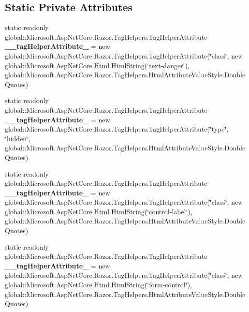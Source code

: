 \subsection*{Static Private Attributes}
\begin{DoxyCompactItemize}
\item 
\mbox{\label{class_asp_net_core_1_1_views___items___edit_af756f4b58e1f7cecb049c515534765eb}} 
static readonly global\+::\+Microsoft.\+Asp\+Net\+Core.\+Razor.\+Tag\+Helpers.\+Tag\+Helper\+Attribute {\bfseries \+\_\+\+\_\+tag\+Helper\+Attribute\+\_} = new global\+::\+Microsoft.\+Asp\+Net\+Core.\+Razor.\+Tag\+Helpers.\+Tag\+Helper\+Attribute(\char`\"{}class\char`\"{}, new global\+::\+Microsoft.\+Asp\+Net\+Core.\+Html.\+Html\+String(\char`\"{}text-\/danger\char`\"{}), global\+::\+Microsoft.\+Asp\+Net\+Core.\+Razor.\+Tag\+Helpers.\+Html\+Attribute\+Value\+Style.\+Double\+Quotes)
\item 
\mbox{\label{class_asp_net_core_1_1_views___items___edit_aecf638c71b63d1ba17280a10a91d20f5}} 
static readonly global\+::\+Microsoft.\+Asp\+Net\+Core.\+Razor.\+Tag\+Helpers.\+Tag\+Helper\+Attribute {\bfseries \+\_\+\+\_\+tag\+Helper\+Attribute\+\_} = new global\+::\+Microsoft.\+Asp\+Net\+Core.\+Razor.\+Tag\+Helpers.\+Tag\+Helper\+Attribute(\char`\"{}type\char`\"{}, \char`\"{}hidden\char`\"{}, global\+::\+Microsoft.\+Asp\+Net\+Core.\+Razor.\+Tag\+Helpers.\+Html\+Attribute\+Value\+Style.\+Double\+Quotes)
\item 
\mbox{\label{class_asp_net_core_1_1_views___items___edit_a49806785a69aa4d2cbdd5aab9dfb6bdc}} 
static readonly global\+::\+Microsoft.\+Asp\+Net\+Core.\+Razor.\+Tag\+Helpers.\+Tag\+Helper\+Attribute {\bfseries \+\_\+\+\_\+tag\+Helper\+Attribute\+\_} = new global\+::\+Microsoft.\+Asp\+Net\+Core.\+Razor.\+Tag\+Helpers.\+Tag\+Helper\+Attribute(\char`\"{}class\char`\"{}, new global\+::\+Microsoft.\+Asp\+Net\+Core.\+Html.\+Html\+String(\char`\"{}control-\/label\char`\"{}), global\+::\+Microsoft.\+Asp\+Net\+Core.\+Razor.\+Tag\+Helpers.\+Html\+Attribute\+Value\+Style.\+Double\+Quotes)
\item 
\mbox{\label{class_asp_net_core_1_1_views___items___edit_ac3cb9776e0796b13fe63d9dea10007c0}} 
static readonly global\+::\+Microsoft.\+Asp\+Net\+Core.\+Razor.\+Tag\+Helpers.\+Tag\+Helper\+Attribute {\bfseries \+\_\+\+\_\+tag\+Helper\+Attribute\+\_} = new global\+::\+Microsoft.\+Asp\+Net\+Core.\+Razor.\+Tag\+Helpers.\+Tag\+Helper\+Attribute(\char`\"{}class\char`\"{}, new global\+::\+Microsoft.\+Asp\+Net\+Core.\+Html.\+Html\+String(\char`\"{}form-\/control\char`\"{}), global\+::\+Microsoft.\+Asp\+Net\+Core.\+Razor.\+Tag\+Helpers.\+Html\+Attribute\+Value\+Style.\+Double\+Quotes)

\end{DoxyCompactItemize}
